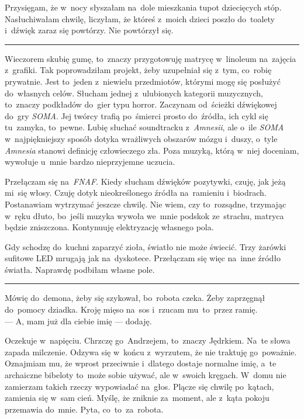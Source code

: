 \documentclass[9pt, a5paper]{memoir}
\begin{document}
Przysięgam, że w~nocy słyszałam na~dole mieszkania tupot dziecięcych stóp. Nasłuchiwałam chwilę, liczyłam, że któreś z~moich dzieci poszło do~toalety i~dźwięk zaraz się powtórzy. Nie powtórzył się.

\fancybreak{* \quad * \quad *}

Wieczorem skubię gumę, to~znaczy przygotowuję matrycę w~linoleum na~zajęcia z~grafiki. Tak poprowadziłam projekt, żeby uzupełniał się z~tym, co~robię prywatnie. Jest to~jeden z~niewielu przedmiotów, którymi mogę się posłużyć do~własnych celów. Słucham jednej z~ulubionych kategorii muzycznych, to~znaczy podkładów do~gier typu horror. Zaczynam od~ścieżki dźwiękowej do~gry \textit{SOMA}. Jej twórcy trafią po~śmierci prosto do~źródła, ich cykl się tu~zamyka, to~pewne. Lubię słuchać soundtracku z~\textit{Amnesii}, ale o~ile \textit{SOMA} w~najpiękniejszy sposób dotyka wrażliwych obszarów mózgu i~duszy, o~tyle \textit{Amnesia} stanowi definicję człowieczego zła. Poza muzyką, którą w~niej doceniam, wywołuje u~mnie bardzo nieprzyjemne uczucia.

Przełączam się na~\textit{FNAF}. Kiedy słucham dźwięków pozytywki, czuję, jak jeżą mi~się włosy. Czuję dotyk nieokreślonego źródła na~ramieniu i~biodrach. Postanawiam wytrzymać jeszcze chwilę. Nie wiem, czy to~rozsądne, trzymając w~ręku dłuto, bo~jeśli muzyka wywoła we~mnie podskok ze~strachu, matryca będzie zniszczona. Kontynuuję elektryzację własnego pola.

Gdy schodzę do~kuchni zaparzyć zioła, światło nie może świecić. Trzy żarówki sufitowe LED mrugają jak na~dyskotece. Przełączam się więc na~inne źródło światła. Naprawdę podbiłam własne pole.

\fancybreak{* \quad * \quad *}

Mówię do~demona, żeby się szykował, bo~robota czeka. Żeby zaprzęgnął do~pomocy dziadka. Kroję mięso na~sos i~rzucam mu~to~przez ramię.\\
--- A, mam już dla ciebie imię --- dodaję.

Oczekuje w~napięciu. Chrzczę go~Andrzejem, to~znaczy Jędrkiem. Na~te słowa zapada milczenie. Odzywa się w~końcu z~wyrzutem, że nie traktuję go~poważnie. Oznajmiam mu, że wprost przeciwnie i~dlatego dostaje normalne imię, a~te archaiczne bibeloty to~może sobie używać, ale w~swoich kręgach. W~domu nie zamierzam takich rzeczy wypowiadać na~głos. Plącze się chwilę po~kątach, zamienia się w~sam cień. Myślę, że zniknie za~moment, ale z~kąta pokoju przemawia do~mnie. Pyta, co~to~za~robota.
\end{document}
